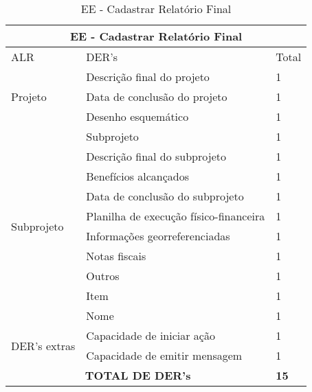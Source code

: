 \begin{table}[]
\centering
\caption{EE - Cadastrar Relatório Final}
\label{ee_cadastrar_relatório_final}
\begin{tabular}{|l|l|l|}
\hline
\multicolumn{3}{|c|}{EE - Cadastrar Relatório Final}                                                                 \\ \hline
ALR                           & DER's                                                & Total              \\ \hline
\multirow{3}{*}{Projeto}     & Descrição final do projeto             & 1 \\ \cline{2-3}
                             & Data de conclusão do projeto           & 1 \\ \cline{2-3}
                             & Desenho esquemático                    & 1 \\ \cline{2-3} \hline
\multirow{10}{*}{Subprojeto} & Subprojeto                             & 1 \\ \cline{2-3}
                             & Descrição final do subprojeto          & 1 \\ \cline{2-3}
                             & Benefícios alcançados                  & 1 \\ \cline{2-3}
                             & Data de conclusão do subprojeto        & 1 \\ \cline{2-3}
                             & Planilha de execução físico-financeira & 1 \\ \cline{2-3}
                             & Informações georreferenciadas          & 1 \\ \cline{2-3}
                             & Notas fiscais                          & 1 \\ \cline{2-3}
                             & Outros                                 & 1 \\ \cline{2-3}
                             & Item                                   & 1 \\ \cline{2-3}
                             & Nome                                   & 1 \\ \cline{2-3} \hline
\multirow{2}{*}{DER's extras} & Capacidade de iniciar ação             & 1 \\ \cline{2-3}
                 & Capacidade de emitir mensagem& 1 \\ \hline

\multicolumn{2}{|c|}{\textbf{TOTAL DE DER's}}                                                 & \textbf{15}                 \\ \hline
\end{tabular}
\end{table}


